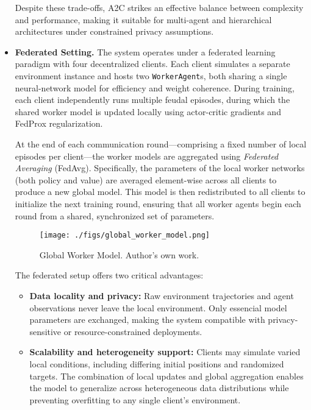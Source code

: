 \documentclass[12pt,a4paper,twoside,openany]{book}
\begin{document}
\begin{itemize}
Despite these trade-offs, A2C strikes an effective balance between complexity and performance, making it suitable for multi-agent and hierarchical architectures under constrained privacy assumptions.

  \item \textbf{Federated Setting.} 
The system operates under a federated learning paradigm with four decentralized clients. Each client simulates a separate environment instance and hosts two \texttt{WorkerAgent}s, both sharing a single neural-network model for efficiency and weight coherence. During training, each client independently runs multiple feudal episodes, during which the shared worker model is updated locally using actor-critic gradients and FedProx regularization.

At the end of each communication round—comprising a fixed number of local episodes per client—the worker models are aggregated using \emph{Federated Averaging} (FedAvg). Specifically, the parameters of the local worker networks (both policy and value) are averaged element-wise across all clients to produce a new global model. This model is then redistributed to all clients to initialize the next training round, ensuring that all worker agents begin each round from a shared, synchronized set of parameters.

\begin{figure}[h]
\centering
\texttt{[image: ./figs/global\_worker\_model.png]}
\captionsetup{font=small}
\caption{Global Worker Model. Author's own work.}
\label{fig:global_worker_model}
\end{figure}

The federated setup offers two critical advantages:
\begin{itemize}
    \item \textbf{Data locality and privacy:} Raw environment trajectories and agent observations never leave the local environment. Only essencial model parameters are exchanged, making the system compatible with privacy-sensitive or resource-constrained deployments.
    \item \textbf{Scalability and heterogeneity support:} Clients may simulate varied local conditions, including differing initial positions and randomized targets. The combination of local updates and global aggregation enables the model to generalize across heterogeneous data distributions while preventing overfitting to any single client’s environment.
\end{itemize}


\end{itemize}
\end{document}
